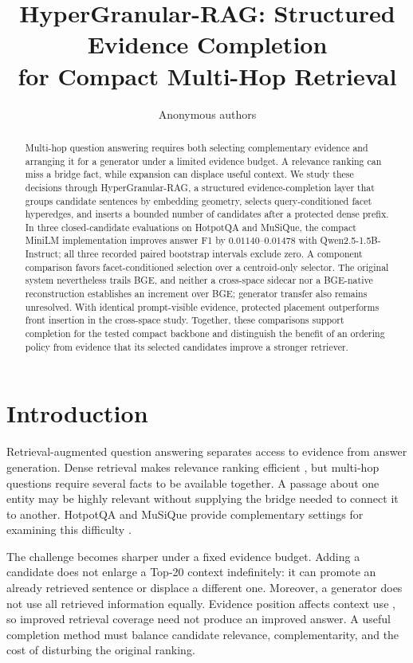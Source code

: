 \documentclass[11pt]{article}
\title{HyperGranular-RAG: Structured Evidence Completion\\
for Compact Multi-Hop Retrieval}
\author{Anonymous authors}
\newcommand{\hgrag}{HyperGranular-RAG\xspace}
\begin{document}
\maketitle

\begin{abstract}
Multi-hop question answering requires both selecting complementary evidence
and arranging it for a generator under a limited evidence budget.
A relevance ranking can miss a bridge fact, while expansion can displace
useful context. We study these decisions through \hgrag, a structured
evidence-completion layer that groups candidate sentences by embedding
geometry, selects query-conditioned facet hyperedges, and inserts a bounded
number of candidates after a protected dense prefix.
In three closed-candidate evaluations on HotpotQA and MuSiQue,
the compact MiniLM implementation improves answer F1 by
$0.01140$--$0.01478$ with Qwen2.5-1.5B-Instruct; all three recorded paired
bootstrap intervals exclude zero. A component comparison favors
facet-conditioned selection over a centroid-only selector. The original system
nevertheless trails BGE, and neither a cross-space sidecar nor a BGE-native
reconstruction establishes an increment over BGE; generator transfer also
remains unresolved. With identical prompt-visible evidence, protected
placement outperforms front insertion in the cross-space study.
Together, these comparisons support completion for the tested compact
backbone and distinguish the benefit of an ordering policy from evidence
that its selected candidates improve a stronger retriever.
\end{abstract}

\section{Introduction}
Retrieval-augmented question answering separates access to evidence from
answer generation. Dense retrieval makes relevance ranking efficient
\citep{karpukhin2020dpr}, but multi-hop questions require several facts to be
available together. A passage about one entity may be highly relevant without
supplying the bridge needed to connect it to another. HotpotQA and MuSiQue
provide complementary settings for examining this difficulty
\citep{yang2018hotpotqa,trivedi2022musique}.

The challenge becomes sharper under a fixed evidence budget. Adding a
candidate does not enlarge a Top-20 context indefinitely: it can promote an
already retrieved sentence or displace a different one. Moreover, a generator
does not use all retrieved information equally. Evidence position affects
context use \citep{liu2024lostmiddle}, so improved retrieval coverage need not
produce an improved answer. A useful completion method must balance
candidate relevance, complementarity, and the cost of disturbing the original
ranking.
\end{document}
